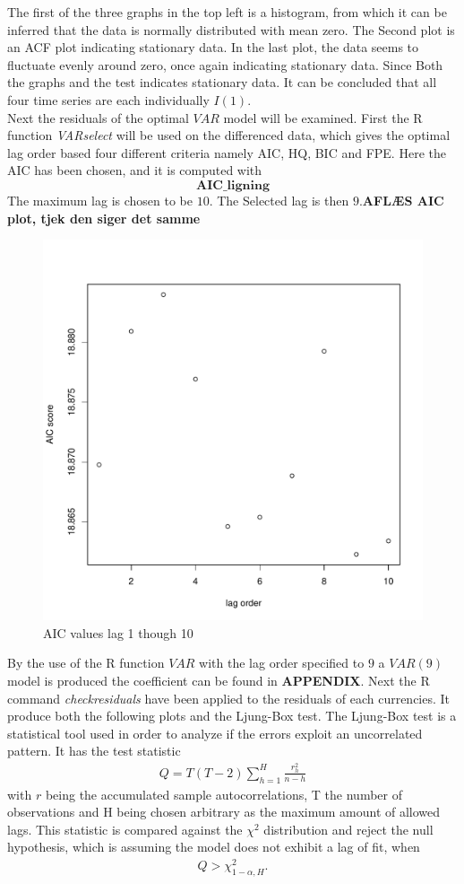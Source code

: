 \noindent The first of the three graphs in the top left is a histogram, from which it can be inferred that the data is normally distributed with mean zero. The Second plot is an ACF plot indicating stationary data. In the last plot, the data seems to fluctuate evenly around zero, once again indicating stationary data.
Since Both the graphs and the test indicates stationary data. It can be concluded that all four time series are each individually $I(1)$.\\

\noindent Next the residuals of the optimal $VAR$ model will be examined. First the R function \textit{VARselect} will be used on the differenced data, which gives the optimal lag order based four different criteria namely AIC, HQ, BIC and FPE. Here the AIC has been chosen, and it is computed with
\begin{equation*}
    \textbf{AIC\_ligning}
\end{equation*}
The maximum lag is chosen to be $10$. The Selected lag is then $9$.\textbf{AFLÆS AIC plot, tjek den siger det samme}\\
\begin{figure}[H]
    \centering
    \includegraphics[width=0.5\linewidth]{1.Projekt_kode/Billeder/AIC_diffed_VAR.pdf}
    \caption{AIC values lag 1 though 10}
    \label{fig:enter-label}
\end{figure}
By the use of the R function $VAR$ with the lag order specified to $9$ a $VAR(9)$ model is produced the coefficient can be found in \textbf{APPENDIX}. Next the R command \textit{checkresiduals} have been applied to the residuals of each currencies. It produce both the following plots and the Ljung-Box test. The Ljung-Box test is a statistical tool used in order to analyze if the errors exploit an uncorrelated pattern. It has the test statistic 
\begin{align*}
    Q=T(T-2)\sum^H_{h=1}\frac{r^2_{h}}{n-h}
\end{align*}
with $r$ being the accumulated sample autocorrelations, T the number of observations and H being chosen arbitrary as the maximum amount of allowed lags. This statistic is compared against the $\chi^2$ distribution and reject the null hypothesis, which is assuming the model does not exhibit a lag of fit, when
\begin{align*}
    Q>\chi^2_{1-\alpha,H}.
\end{align*}

